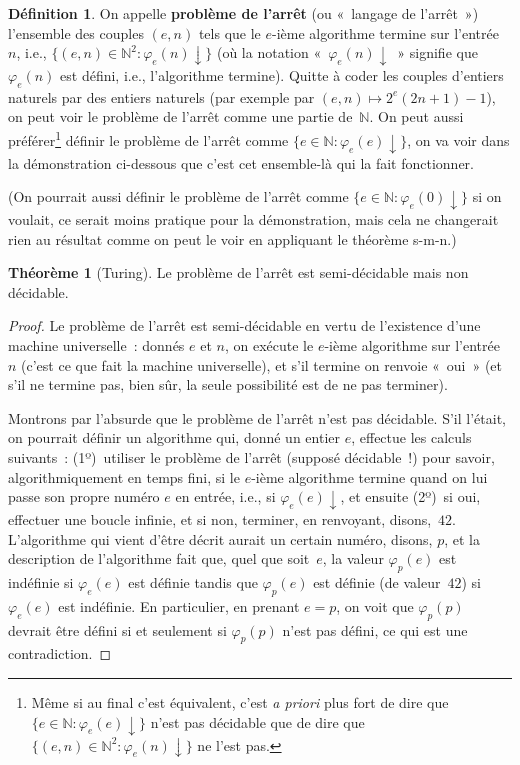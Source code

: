 \documentclass[12pt,a4paper]{article}
\theoremstyle{definition}
\newtheorem{defn}[comcnt]{Définition}
\newtheorem{thm}[comcnt]{Théorème}
\newcommand{\defin}[2][]{\def\latexsucks{#1}\ifx\latexsucks\empty\index{#2}\else\index{\latexsucks}\fi\textbf{#2}}
\begin{document}
\begin{defn}
On appelle \defin{problème de l'arrêt} (ou « langage de l'arrêt »)
l'ensemble des couples $(e,n)$ tels que le $e$-ième algorithme termine
sur l'entrée $n$, i.e., $\{(e,n) \in \mathbb{N}^2 :
\varphi_e(n)\downarrow\}$ (où la notation « $\varphi_e(n)\downarrow$ »
signifie que $\varphi_e(n)$ est défini, i.e., l'algorithme termine).
Quitte à coder les couples d'entiers naturels par des entiers naturels
(par exemple par $(e,n) \mapsto 2^e(2n+1)-1$), on peut voir le problème
de l'arrêt comme une partie de $\mathbb{N}$.  On peut aussi
préférer\footnote{Même si au final c'est équivalent, c'est \textit{a
    priori} plus fort de dire que $\{e \in \mathbb{N} :
  \varphi_e(e)\downarrow\}$ n'est pas décidable que de dire que
  $\{(e,n) \in \mathbb{N}^2 : \varphi_e(n)\downarrow\}$ ne l'est pas.}
définir le problème de l'arrêt comme $\{e \in \mathbb{N} :
\varphi_e(e)\downarrow\}$, on va voir dans la démonstration ci-dessous
que c'est cet ensemble-là qui la fait fonctionner.
\end{defn}

{\footnotesize (On pourrait aussi définir le problème de l'arrêt comme
  $\{e \in \mathbb{N} : \varphi_e(0)\downarrow\}$ si on voulait, ce
  serait moins pratique pour la démonstration, mais cela ne changerait
  rien au résultat comme on peut le voir en appliquant le théorème
  s-m-n.)\par}

\begin{thm}[Turing]\label{undecidability-of-halting-problem}
Le problème de l'arrêt est semi-décidable mais non décidable.
\end{thm}
\begin{proof}
Le problème de l'arrêt est semi-décidable en vertu de l'existence
d'une machine universelle : donnés $e$ et $n$, on exécute le $e$-ième
algorithme sur l'entrée $n$ (c'est ce que fait la machine
universelle), et s'il termine on renvoie « oui » (et s'il ne termine
pas, bien sûr, la seule possibilité est de ne pas terminer).

Montrons par l'absurde que le problème de l'arrêt n'est pas décidable.
S'il l'était, on pourrait définir un algorithme qui, donné un entier
$e$, effectue les calculs suivants : (1º) utiliser le problème de
l'arrêt (supposé décidable !) pour savoir, algorithmiquement en temps
fini, si le $e$-ième algorithme termine quand on lui passe son propre
numéro $e$ en entrée, i.e., si $\varphi_e(e)\downarrow$, et ensuite
(2º) si oui, effectuer une boucle infinie, et si non, terminer, en
renvoyant, disons, $42$.  L'algorithme qui vient d'être décrit aurait
un certain numéro, disons, $p$, et la description de l'algorithme fait
que, quel que soit $e$, la valeur $\varphi_p(e)$ est indéfinie si
$\varphi_e(e)$ est définie tandis que $\varphi_p(e)$ est définie (de
valeur $42$) si $\varphi_e(e)$ est indéfinie.  En particulier, en
prenant $e=p$, on voit que $\varphi_p(p)$ devrait être défini si et
seulement si $\varphi_p(p)$ n'est pas défini, ce qui est une
contradiction.
\end{proof}
\end{document}
